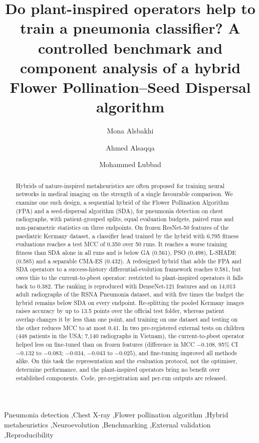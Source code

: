 \documentclass[preprint,12pt]{elsarticle}
\begin{document}
\begin{frontmatter}
\title{Do plant-inspired operators help to train a pneumonia classifier? A controlled benchmark and component analysis of a hybrid Flower Pollination--Seed Dispersal algorithm}
\author[eng]{Mona Alsbakhi}
\author[it,up]{Ahmed Alsaqqa}
\author[eng]{Mohammed Lubbad}

\begin{abstract}
Hybrids of nature-inspired metaheuristics are often proposed for training neural networks in medical imaging on the strength of a single favourable comparison. We examine one such design, a sequential hybrid of the Flower Pollination Algorithm (FPA) and a seed-dispersal algorithm (SDA), for pneumonia detection on chest radiographs, with patient-grouped splits, equal evaluation budgets, paired runs and non-parametric statistics on three endpoints. On frozen ResNet-50 features of the paediatric Kermany dataset, a classifier head trained by the hybrid with 6,795 fitness evaluations reaches a test MCC of 0.350 over 50 runs. It reaches a worse training fitness than SDA alone in all runs and is below GA (0.561), PSO (0.498), L-SHADE (0.585) and a separable CMA-ES (0.432). A redesigned hybrid that adds the FPA and SDA operators to a success-history differential-evolution framework reaches 0.581, but owes this to the current-to-$p$best operator: restricted to plant-inspired operators it falls back to 0.382. The ranking is reproduced with DenseNet-121 features and on 14,013 adult radiographs of the RSNA Pneumonia dataset, and with five times the budget the hybrid remains below SDA on every endpoint. Re-splitting the pooled Kermany images raises accuracy by up to 13.5 points over the official test folder, whereas patient overlap changes it by less than one point, and training on one dataset and testing on the other reduces MCC to at most 0.41. In two pre-registered external tests on children (448 patients in the USA; 7,140 radiographs in Vietnam), the current-to-$p$best operator helped less on fine-tuned than on frozen features (difference in MCC $-0.108$, 95\% CI $-0.132$ to $-0.083$; $-0.034$, $-0.043$ to $-0.025$), and fine-tuning improved all methods alike. On this task the representation and the evaluation protocol, not the optimiser, determine performance, and the plant-inspired operators bring no benefit over established components. Code, pre-registration and per-run outputs are released.
\end{abstract}

\begin{keyword}
Pneumonia detection \sep Chest X-ray \sep Flower pollination algorithm \sep Hybrid metaheuristics \sep Neuroevolution \sep Benchmarking \sep External validation \sep Reproducibility
\end{keyword}
\end{frontmatter}
\end{document}
